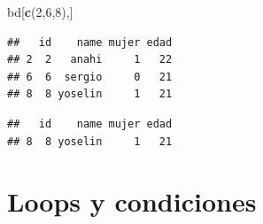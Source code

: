 \documentclass[
]{book}
\newenvironment{Shaded}{\begin{snugshade}}{\end{snugshade}}
\newcommand{\CommentTok}[1]{\textcolor[rgb]{0.56,0.35,0.01}{\textit{#1}}}
\newcommand{\DecValTok}[1]{\textcolor[rgb]{0.00,0.00,0.81}{#1}}
\newcommand{\KeywordTok}[1]{\textcolor[rgb]{0.13,0.29,0.53}{\textbf{#1}}}
\newcommand{\NormalTok}[1]{#1}
\newcommand{\OperatorTok}[1]{\textcolor[rgb]{0.81,0.36,0.00}{\textbf{#1}}}
\newcommand{\StringTok}[1]{\textcolor[rgb]{0.31,0.60,0.02}{#1}}
\begin{document}
\begin{Shaded}
\begin{Highlighting}[]
\NormalTok{bd[}\KeywordTok{c}\NormalTok{(}\DecValTok{2}\NormalTok{,}\DecValTok{6}\NormalTok{,}\DecValTok{8}\NormalTok{),]}
\end{Highlighting}
\end{Shaded}

\begin{verbatim}
##   id    name mujer edad
## 2  2   anahi     1   22
## 6  6  sergio     0   21
## 8  8 yoselin     1   21
\end{verbatim}

\begin{Shaded}
\end{Shaded}

\begin{verbatim}
##   id    name mujer edad
## 8  8 yoselin     1   21
\end{verbatim}

\begin{Shaded}
\end{Shaded}

\hypertarget{loops-y-condiciones}{%
\section{Loops y condiciones}\label{loops-y-condiciones}}
\end{document}
